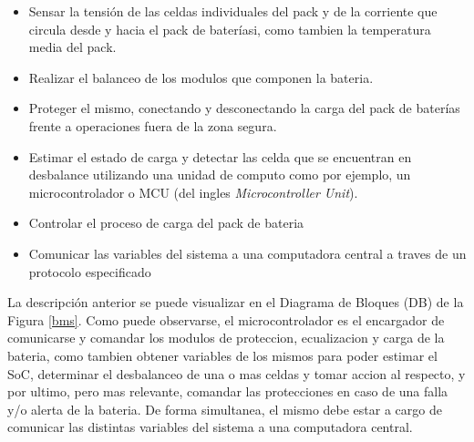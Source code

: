 \documentclass[10pt,a4paper]{article}
\begin{document}
	\begin{itemize}
		\item Sensar la tensión de las celdas individuales del pack y de la 
        corriente que circula desde y hacia el pack de bateríasi, como tambien 
        la temperatura media del pack.
		\item Realizar el balanceo de los modulos que componen la bateria.
		\item Proteger el mismo, conectando y desconectando la carga del 
        pack de baterías frente a operaciones fuera de la zona segura. 
		\item Estimar el estado de carga y detectar las celda que se encuentran
            en desbalance utilizando una unidad de computo como por ejemplo, un
            microcontrolador o MCU (del ingles \emph{Microcontroller Unit}).
        \item Controlar el proceso de carga del pack de bateria
        \item Comunicar las variables del sistema a una computadora central a
        traves de un protocolo especificado
	\end{itemize}
	
	\noindent La descripción anterior se puede visualizar en el Diagrama de 
    Bloques (DB) de la Figura \ref{bms}. Como puede observarse, 
    el microcontrolador es el encargador de comunicarse y comandar los modulos 
    de proteccion, ecualizacion y carga de la bateria, como tambien obtener 
    variables de los mismos para poder estimar el SoC, determinar el 
    desbalanceo de una o mas celdas y tomar accion al respecto, y por ultimo, 
    pero mas relevante, comandar las protecciones en caso de una falla y/o 
    alerta de la bateria. De forma simultanea, el mismo debe estar a cargo de 
    comunicar las distintas variables del sistema a una computadora central.

    \clearpage
\end{document}
